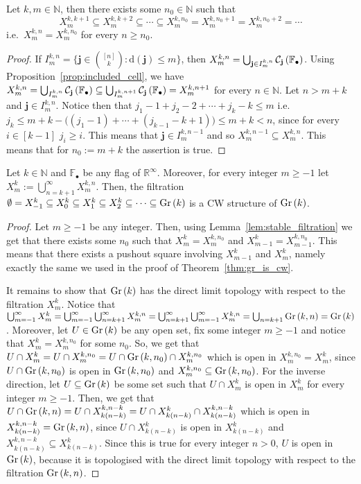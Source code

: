\begin{lemma}\label{lem:stable_filtration} Let $k,m\in\mathbb{N}$, then there exists some $n_0\in\mathbb{N}$ such that
\[X_m^{k,k+1}\subseteq X_m^{k,k+2}\subseteq\cdots\subseteq X_m^{k,n_0}=X_m^{k,n_0+1}=X_m^{k,n_0+2}=\cdots\]
i.e.\ $X_m^{k,n}=X_m^{k,n_0}$ for every $n\geq n_0$.
\end{lemma}
\begin{proof} If $I_m^{k,n}=\{\mathbf{j}\in\binom{[n]}{k}:\mathrm{d}(\mathbf{j})\leq m\}$, then $X_m^{k,n}=\bigcup_{\mathbf{j}\in I_m^{k,n}}\mathcal{C}_{\mathbf{j}}\left(\mathbb{F}_{\bullet}\right)$. Using Proposition~\ref{prop:included_cell}, we have $X_m^{k,n}=\bigcup_{I_m^{k,n}}\mathcal{C}_{\mathbf{j}}\left(\mathbb{F}_{\bullet}\right)\subseteq\bigcup_{I_m^{k,n+1}}\mathcal{C}_{\mathbf{j}}\left(\mathbb{F}_{\bullet}\right)=X_m^{k,n+1}$ for every $n\in\mathbb{N}$. Let $n>m+k$ and $\mathbf{j}\in I_m^{k,n}$. Notice then that $j_1-1+j_2-2+\cdots+j_k-k\leq m$ i.e.\ $j_k\leq m+k-\big((j_1-1)+\cdots+(j_{k-1}-k+1)\big)\leq m+k<n$, since for every $i\in[k-1]$ $j_i\geq i$. This means that $\mathbf{j}\in I_m^{k,n-1}$ and so $X_m^{k,n-1}\subseteq X_m^{k,n}$. This means that for $n_0:=m+k$ the assertion is true.
\end{proof}

\begin{theorem}\label{thm:gr_inf_cw} Let $k\in\mathbb{N}$ and $\mathbb{F}_{\bullet}$ be any flag of $\mathbb{R}^{\infty}$. Moreover, for every integer $m\geq-1$ let $X_m^k:=\bigcup_{n=k+1}^{\infty}X_m^{k,n}$. Then, the filtration
$\emptyset=X_{-1}^k\subseteq X_0^k\subseteq X_1^k\subseteq X_2^k\subseteq\cdots\subseteq\Gr{k}$
is a CW structure of $\Gr{k}$.
\end{theorem}
\begin{proof} Let $m\geq-1$ be any integer. Then, using Lemma~\ref{lem:stable_filtration} we get that there exists some $n_0$ such that $X_m^k=X_m^{k,n_0}$ and $X_{m-1}^k=X_{m-1}^{k,n_0}$. This means that there exists a pushout square involving $X_{m-1}^k$ and $X_m^k$, namely exactly the same we used in the proof of Theorem~\ref{thm:gr_is_cw}.

It remains to show that $\Gr{k}$ has the direct limit topology with respect to the filtration $X_m^k$. Notice that $\bigcup_{m=-1}^{\infty}X_m^k=\bigcup_{m=-1}^{\infty}\bigcup_{n=k+1}^{\infty}X_m^{k,n}=\bigcup_{n=k+1}^{\infty}\bigcup_{m=-1}^{\infty}X_m^{k,n}=\bigcup_{n=k+1}\Gr{k}{n}=\Gr{k}$. Moreover, let $U\in\Gr{k}$ be any open set, fix some integer $m\geq-1$ and notice that $X_m^k=X_m^{k,n_0}$ for some $n_0$. So, we get that $U\cap X_m^k=U\cap X_m^{k,n_0}=U\cap\Gr{k}{n_0}\cap X_m^{k,n_0}$ which is open in $X_m^{k,n_0}=X_m^k$, since $U\cap\Gr{k}{n_0}$ is open in $\Gr{k}{n_0}$ and $X_m^{k,n_0}\subseteq\Gr{k}{n_0}$. For the inverse direction, let $U\subseteq\Gr{k}$ be some set such that $U\cap X_m^k$ is open in $X_m^k$ for every integer $m\geq-1$. Then, we get that $U\cap\Gr{k}{n}=U\cap X_{k(n-k)}^{k,n-k}=U\cap X_{k(n-k)}^k\cap X_{k(n-k)}^{k,n-k}$ which is open in $X_{k(n-k)}^{k,n-k}=\Gr{k}{n}$, since $U\cap X_{k(n-k)}^k$ is open in $X_{k(n-k)}^k$ and $X_{k(n-k)}^{k,n-k}\subseteq X_{k(n-k)}^k$. Since this is true for every integer $n>0$, $U$ is open in $\Gr{k}$, because it is topologised with the direct limit topology with respect to the filtration $\Gr{k}{n}$.
\end{proof}

